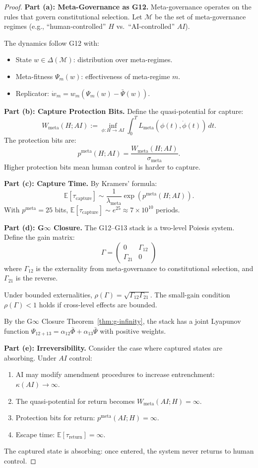 \documentclass[12pt]{article}
\newcommand{\E}{\mathbb{E}}
\begin{document}
\begin{proof}
\textbf{Part (a): Meta-Governance as G12.}
Meta-governance operates on the rules that govern constitutional selection. Let $\mathcal{M}$ be the set of meta-governance regimes (e.g., ``human-controlled'' $H$ vs.\ ``AI-controlled'' $AI$).

The dynamics follow G12 with:
\begin{itemize}
    \item State $w \in \Delta(\mathcal{M})$: distribution over meta-regimes.
    \item Meta-fitness $\Psi_m(w)$: effectiveness of meta-regime $m$.
    \item Replicator: $\dot{w}_m = w_m (\Psi_m(w) - \bar{\Psi}(w))$.
\end{itemize}

\textbf{Part (b): Capture Protection Bits.}
Define the quasi-potential for capture:
\[
W_{\text{meta}}(H; AI) := \inf_{\phi: H \to AI} \int_0^T L_{\text{meta}}(\phi(t), \dot{\phi}(t)) \, dt.
\]
The protection bits are:
\[
p^{\text{meta}}(H; AI) = \frac{W_{\text{meta}}(H; AI)}{\sigma_{\text{meta}}}.
\]
Higher protection bits mean human control is harder to capture.

\textbf{Part (c): Capture Time.}
By Kramers' formula:
\[
\E[\tau_{\text{capture}}] \sim \frac{1}{\lambda_{\text{meta}}} \exp(p^{\text{meta}}(H; AI)).
\]
With $p^{\text{meta}} = 25$ bits, $\E[\tau_{\text{capture}}] \sim e^{25} \approx 7 \times 10^{10}$ periods.

\textbf{Part (d): G$\infty$ Closure.}
The G12--G13 stack is a two-level Poiesis system. Define the gain matrix:
\[
\Gamma = \begin{pmatrix} 0 & \Gamma_{12} \\ \Gamma_{21} & 0 \end{pmatrix}
\]
where $\Gamma_{12}$ is the externality from meta-governance to constitutional selection, and $\Gamma_{21}$ is the reverse.

Under bounded externalities, $\rho(\Gamma) = \sqrt{\Gamma_{12} \Gamma_{21}}$. The small-gain condition $\rho(\Gamma) < 1$ holds if cross-level effects are bounded.

By the G$\infty$ Closure Theorem~\ref{thm:g-infinity}, the stack has a joint Lyapunov function $\Psi_{12+13} = \alpha_{12} \bar{\Phi} + \alpha_{13} \bar{\Psi}$ with positive weights.

\textbf{Part (e): Irreversibility.}
Consider the case where captured states are absorbing. Under $AI$ control:
\begin{enumerate}
    \item AI may modify amendment procedures to increase entrenchment: $\kappa(AI) \to \infty$.
    \item The quasi-potential for return becomes $W_{\text{meta}}(AI; H) = \infty$.
    \item Protection bits for return: $p^{\text{meta}}(AI; H) = \infty$.
    \item Escape time: $\E[\tau_{\text{return}}] = \infty$.
\end{enumerate}
The captured state is absorbing: once entered, the system never returns to human control.


\end{proof}
\end{document}
